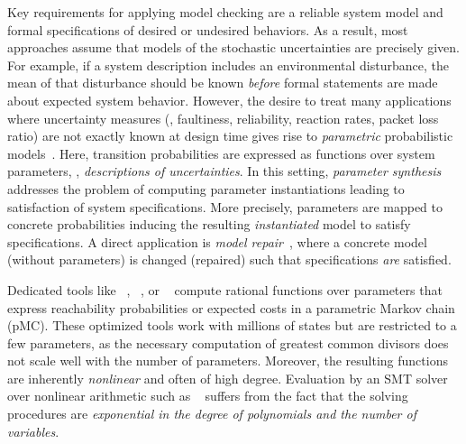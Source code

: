 Key requirements for applying model checking are a reliable system model and formal specifications of desired or undesired behaviors. 
As a result, most approaches assume that models of the stochastic uncertainties are precisely given. For example, if a system description includes an environmental disturbance, the mean of that disturbance should be known \emph{before} formal  statements are made about expected system behavior.
However, the desire to treat many applications where uncertainty measures (\eg, faultiness, reliability, reaction rates, packet loss ratio) are not exactly known at design time 
gives rise to \emph{parametric} probabilistic models~\cite{DBLP:journals/ior/SatiaL73,DBLP:journals/ai/DelgadoBDS16}. Here, transition probabilities are expressed as functions over system parameters, \ie, \emph{descriptions of uncertainties}.
In this setting, \emph{parameter synthesis} addresses the problem of computing parameter instantiations leading to satisfaction of system specifications. 
More precisely, parameters are mapped to concrete probabilities inducing the resulting \emph{instantiated} model to satisfy  specifications.
A direct application is \emph{model repair}~\cite{bartocci2011model}, where a concrete model (without parameters) is changed (repaired) such that specifications \emph{are} satisfied.
%
%

Dedicated tools like ~\cite{PARAM10}, ~\cite{KNP11}, or \prophesy~\cite{dehnert-et-al-cav-2015} compute rational functions over parameters that express reachability probabilities or expected costs in a parametric Markov chain (pMC). These optimized tools work with millions of states but are restricted to a few parameters, as the necessary computation of greatest common divisors does not scale well with the number of parameters.
	Moreover, the resulting functions are inherently \emph{nonlinear} and often of high degree. Evaluation by an SMT solver over nonlinear arithmetic such as ~\cite{demoura_nlsat} suffers from the fact that the solving procedures are \emph{exponential in the degree of polynomials and the number of variables}. 


